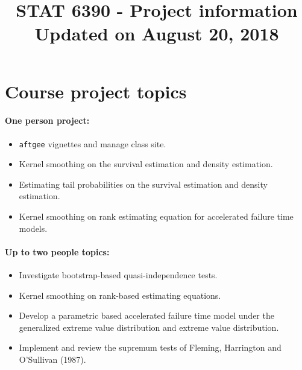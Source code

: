 \documentclass[a4paper,10pt]{article}
\title{STAT 6390 - Project information\\\vspace{.5cm}
\normalsize	Updated on August 20, 2018}
\date{}
\begin{document}
\maketitle
\section*{Course project topics}
\paragraph{One person project:}
\begin{itemize}
\item \texttt{aftgee} vignettes and manage class site.
\item Kernel smoothing on the survival estimation and density estimation.
\item Estimating tail probabilities on the survival estimation and density estimation.
\item Kernel smoothing on rank estimating equation for accelerated failure time models.
\end{itemize}
\paragraph{Up to two people topics:}
\begin{itemize}
\item Investigate bootstrap-based quasi-independence tests. 
\item Kernel smoothing on rank-based estimating equations.
\item Develop a parametric based accelerated failure time model under the generalized extreme value distribution and extreme value distribution.
\item Implement and review the supremum tests of Fleming, Harrington and O'Sullivan (1987).
\end{itemize}

\newpage
\end{document}
